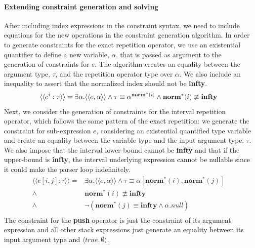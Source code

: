\documentclass[preprint,12pt]{elsarticle}
\theoremstyle{definition}
\begin{document}
\paragraph{Extending constraint generation and solving} After including index expressions
in the constraint syntax, we need to include equations for the new operations
in the constraint generation algorithm.
In order to generate constraints for the exact repetition operator, we use
an existential quantifier to define a new variable, $\alpha$, that is passed
as argument to the generation of constraints for $e$. The algorithm creates
an equality between the argument type, $\tau$, and the repetition operator
type over $\alpha$. We also include an inequality to assert that the
normalized index should not be \textbf{infty}.
\[
  \langle\langle e^i : \tau \rangle\rangle = \exists \alpha . \langle\langle e,\alpha\rangle\rangle \land \tau \equiv \alpha^{\mathbf{norm}^{\ast}(i)} \land \mathbf{norm}^{\ast}(i) \not\equiv \mathbf{infty}\\
\]
Next, we consider the generation of constraints for the interval repetition operator, which
follows the same pattern of the exact repetition: we generate the constraint for sub-expression
$e$, considering an existential quantified type variable and create an equality between the variable
type and the input argument type, $\tau$. We also impose that the interval lower-bound
cannot be \textbf{infty} and that if the upper-bound is \textbf{infty}, the interval
underlying expression cannot be nullable since it could make the parser loop indefinitely.
\[
  \begin{array}{rl}
    \langle\langle e[i,j] : \tau \rangle\rangle =   & \exists \alpha . \langle\langle e, \alpha\rangle\rangle \land \tau \equiv \alpha[\mathbf{norm}^{\ast}(i),\mathbf{norm}^{\ast}(j)]\\
                                            \land{} & \mathbf{norm}^{\ast}(i) \not\equiv\mathbf{infty} \\
                                            \land{} & \neg (\mathbf{norm}^{\ast}(j) \equiv \mathbf{infty} \land \alpha.null)\\
  \end{array}
\]
The constraint for the \textbf{push} operator is just the constraint of its argument expression and
all other stack expressions just generate an equality between its input argument type and
$\langle true,\emptyset\rangle$.
\end{document}
